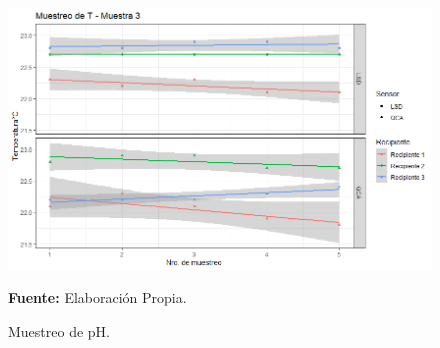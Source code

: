     \begin{figure}[H]
        \centering
        \includegraphics[width=0.75\linewidth]{Imagenes/cap4/T_M3.png}
        \caption {Muestreo de pH. }{\textbf{Fuente:}
        Elaboraci\'on Propia. }
        \label{fig:M3T}
    \end{figure}

